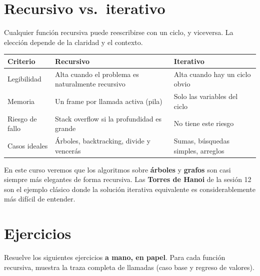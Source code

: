 \documentclass[12pt, oneside]{article}
\begin{document}
\section{Recursivo vs.\ iterativo}

Cualquier función recursiva puede reescribirse con un ciclo, y viceversa.
La elección depende de la claridad y el contexto.

\begin{center}
\begin{tabular}{lll}
  \toprule
  \textbf{Criterio} & \textbf{Recursivo} & \textbf{Iterativo} \\
  \midrule
  Legibilidad      & Alta cuando el problema es naturalmente recursivo
                   & Alta cuando hay un ciclo obvio \\[4pt]
  Memoria          & Un frame por llamada activa (pila)
                   & Solo las variables del ciclo \\[4pt]
  Riesgo de fallo  & Stack overflow si la profundidad es grande
                   & No tiene este riesgo \\[4pt]
  Casos ideales    & Árboles, backtracking, divide y vencerás
                   & Sumas, búsquedas simples, arreglos \\
  \bottomrule
\end{tabular}
\end{center}

\begin{recuerda}
  En este curso veremos que los algoritmos sobre \textbf{árboles} y
  \textbf{grafos} son casi siempre más elegantes de forma recursiva.
  Las \textbf{Torres de Hanoi} de la sesión 12 son el ejemplo clásico donde
  la solución iterativa equivalente es considerablemente más difícil de
  entender.
\end{recuerda}

\section{Ejercicios}

Resuelve los siguientes ejercicios \textbf{a mano, en papel}.
Para cada función recursiva, muestra la traza completa de llamadas
(caso base y regreso de valores).
\end{document}
